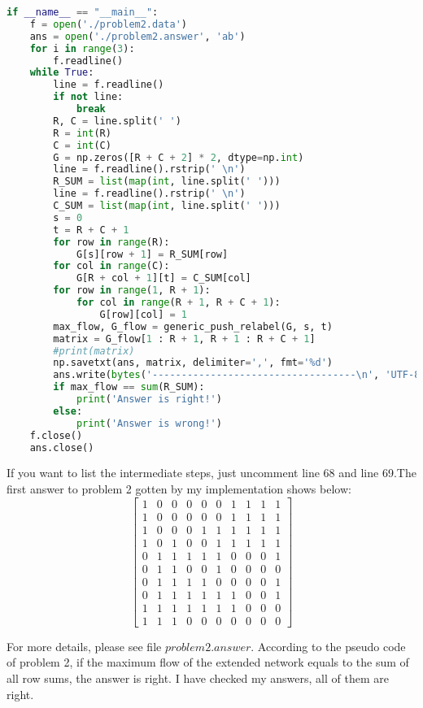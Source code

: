\documentclass[a4paper,12pt]{article}
\begin{document}
\begin{lstlisting}[language=python]
if __name__ == "__main__":
    f = open('./problem2.data')
    ans = open('./problem2.answer', 'ab')
    for i in range(3):
        f.readline()
    while True:
        line = f.readline()
        if not line:
            break
        R, C = line.split(' ')
        R = int(R)
        C = int(C)
        G = np.zeros([R + C + 2] * 2, dtype=np.int)
        line = f.readline().rstrip(' \n')
        R_SUM = list(map(int, line.split(' ')))
        line = f.readline().rstrip(' \n')
        C_SUM = list(map(int, line.split(' ')))
        s = 0
        t = R + C + 1
        for row in range(R):
            G[s][row + 1] = R_SUM[row]
        for col in range(C):
            G[R + col + 1][t] = C_SUM[col]
        for row in range(1, R + 1):
            for col in range(R + 1, R + C + 1):
                G[row][col] = 1
        max_flow, G_flow = generic_push_relabel(G, s, t)
        matrix = G_flow[1 : R + 1, R + 1 : R + C + 1]
        #print(matrix)
        np.savetxt(ans, matrix, delimiter=',', fmt='%d')
        ans.write(bytes('-----------------------------------\n', 'UTF-8'))
        if max_flow == sum(R_SUM):
            print('Answer is right!')
        else:
            print('Answer is wrong!')
    f.close()
    ans.close()
\end{lstlisting}

If you want to list the intermediate steps, just uncomment line 68 and line 69.The first answer to problem 2 gotten by my implementation shows below:
\[
\begin{bmatrix}
1&0&0&0&0&0&1&1&1&1\\
1&0&0&0&0&0&1&1&1&1\\
1&0&0&0&1&1&1&1&1&1\\
1&0&1&0&0&1&1&1&1&1\\
0&1&1&1&1&1&0&0&0&1\\
0&1&1&0&0&1&0&0&0&0\\
0&1&1&1&1&0&0&0&0&1\\
0&1&1&1&1&1&1&0&0&1\\
1&1&1&1&1&1&1&0&0&0\\
1&1&1&0&0&0&0&0&0&0
\end{bmatrix}
\]

For more details, please see file \href{run:./problem2.answer}{$problem2.answer$}. According to the pseudo code of problem 2, if the maximum flow of the extended network equals to the sum of all row sums, the answer is right. I have checked my answers, all of them are right.
\end{document}
